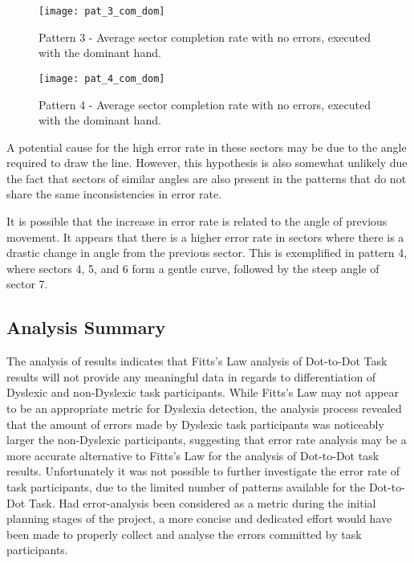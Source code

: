 		\begin{figure}[!h]
			\centering
			\texttt{[image: pat\_3\_com\_dom]}
			\caption{Pattern 3 - Average sector completion rate with no errors, executed with the dominant hand.}
			\label{fig_pat_3_com_dom}
		\end{figure}		
		
		\begin{figure}[!h]
			\centering
			\texttt{[image: pat\_4\_com\_dom]}
			\caption{Pattern 4 - Average sector completion rate with no errors, executed with the dominant hand.}
			\label{fig_pat_4_com_dom}
		\end{figure}	
		
		A potential cause for the high error rate in these sectors may be due to the angle required to draw the line. However, this hypothesis is also somewhat unlikely due the fact that sectors of similar angles are also present in the patterns that do not share the same inconsistencies in error rate. 
		
		It is possible that the increase in error rate is related to the angle of previous movement. It appears that there is a higher error rate in sectors where there is a drastic change in angle from the previous sector. This is exemplified in pattern 4, where sectors 4, 5, and 6 form a gentle curve, followed by the steep angle of sector 7.
		
	\subsection{Analysis Summary}
		The analysis of results indicates that Fitts’s Law analysis of Dot-to-Dot Task results will not provide any meaningful data in regards to differentiation of Dyslexic and non-Dyslexic task participants. While Fitts’s Law may not appear to be an appropriate metric for Dyslexia detection, the analysis process revealed that the amount of errors made by Dyslexic task participants was noticeably larger the non-Dyslexic participants, suggesting that error rate analysis may be a more accurate alternative to Fitts’s Law for the analysis of Dot-to-Dot task results. Unfortunately it was not possible to further investigate the error rate of task participants, due to the limited number of patterns available for the Dot-to-Dot Task. Had error-analysis been considered as a metric during the initial planning stages of the project, a more concise and dedicated effort would have been made to properly collect and analyse the errors committed by task participants.	
\newpage